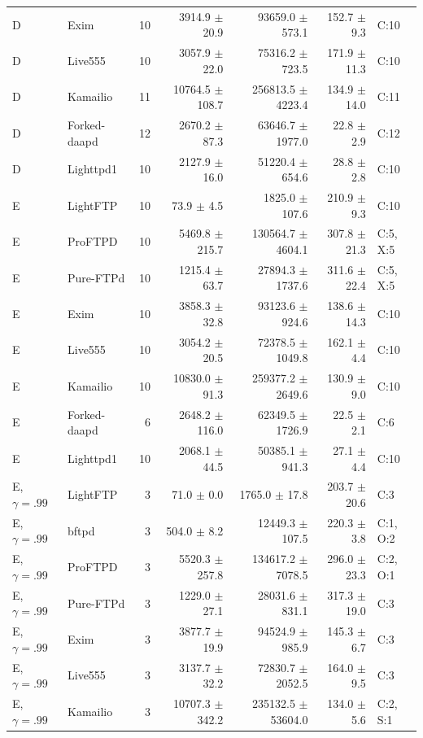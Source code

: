 \begin{longtable}{@{}llrrrrl@{}}
D & Exim & 10 & 3914.9 $\pm$ 20.9 & 93659.0 $\pm$ 573.1 & 152.7 $\pm$ 9.3 & C:10 \\
D & Live555 & 10 & 3057.9 $\pm$ 22.0 & 75316.2 $\pm$ 723.5 & 171.9 $\pm$ 11.3 & C:10 \\
D & Kamailio & 11 & 10764.5 $\pm$ 108.7 & 256813.5 $\pm$ 4223.4 & 134.9 $\pm$ 14.0 & C:11 \\
D & Forked-daapd & 12 & 2670.2 $\pm$ 87.3 & 63646.7 $\pm$ 1977.0 & 22.8 $\pm$ 2.9 & C:12 \\
D & Lighttpd1 & 10 & 2127.9 $\pm$ 16.0 & 51220.4 $\pm$ 654.6 & 28.8 $\pm$ 2.8 & C:10 \\
\addlinespace[3pt]
E & LightFTP & 10 & 73.9 $\pm$ 4.5 & 1825.0 $\pm$ 107.6 & 210.9 $\pm$ 9.3 & C:10 \\
E & ProFTPD & 10 & 5469.8 $\pm$ 215.7 & 130564.7 $\pm$ 4604.1 & 307.8 $\pm$ 21.3 & C:5, X:5 \\
E & Pure-FTPd & 10 & 1215.4 $\pm$ 63.7 & 27894.3 $\pm$ 1737.6 & 311.6 $\pm$ 22.4 & C:5, X:5 \\
E & Exim & 10 & 3858.3 $\pm$ 32.8 & 93123.6 $\pm$ 924.6 & 138.6 $\pm$ 14.3 & C:10 \\
E & Live555 & 10 & 3054.2 $\pm$ 20.5 & 72378.5 $\pm$ 1049.8 & 162.1 $\pm$ 4.4 & C:10 \\
E & Kamailio & 10 & 10830.0 $\pm$ 91.3 & 259377.2 $\pm$ 2649.6 & 130.9 $\pm$ 9.0 & C:10 \\
E & Forked-daapd & 6 & 2648.2 $\pm$ 116.0 & 62349.5 $\pm$ 1726.9 & 22.5 $\pm$ 2.1 & C:6 \\
E & Lighttpd1 & 10 & 2068.1 $\pm$ 44.5 & 50385.1 $\pm$ 941.3 & 27.1 $\pm$ 4.4 & C:10 \\
\addlinespace[3pt]
E, $\gamma=.99$ & LightFTP & 3 & 71.0 $\pm$ 0.0 & 1765.0 $\pm$ 17.8 & 203.7 $\pm$ 20.6 & C:3 \\
E, $\gamma=.99$ & bftpd & 3 & 504.0 $\pm$ 8.2 & 12449.3 $\pm$ 107.5 & 220.3 $\pm$ 3.8 & C:1, O:2 \\
E, $\gamma=.99$ & ProFTPD & 3 & 5520.3 $\pm$ 257.8 & 134617.2 $\pm$ 7078.5 & 296.0 $\pm$ 23.3 & C:2, O:1 \\
E, $\gamma=.99$ & Pure-FTPd & 3 & 1229.0 $\pm$ 27.1 & 28031.6 $\pm$ 831.1 & 317.3 $\pm$ 19.0 & C:3 \\
E, $\gamma=.99$ & Exim & 3 & 3877.7 $\pm$ 19.9 & 94524.9 $\pm$ 985.9 & 145.3 $\pm$ 6.7 & C:3 \\
E, $\gamma=.99$ & Live555 & 3 & 3137.7 $\pm$ 32.2 & 72830.7 $\pm$ 2052.5 & 164.0 $\pm$ 9.5 & C:3 \\
E, $\gamma=.99$ & Kamailio & 3 & 10707.3 $\pm$ 342.2 & 235132.5 $\pm$ 53604.0 & 134.0 $\pm$ 5.6 & C:2, S:1 \\

\end{longtable}
